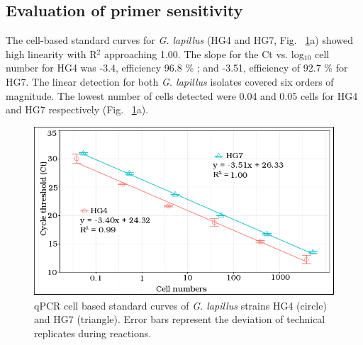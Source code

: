 \documentclass[12pt]{article}
\begin{document}
 
\subsection*{Evaluation of primer sensitivity}
\FloatBarrier
The cell-based standard curves for \emph{G. lapillus} (HG4 and HG7, Fig. ~\ref{fig:stdCurve}a) showed high linearity with R$^{2}$ approaching 1.00. 
The slope for the Ct vs. log$_{10}$ cell number for HG4  was -3.4, efficiency 96.8 \%%
; and -3.51, efficiency of 92.7 \% %
for HG7. The linear detection for both \emph{G. lapillus} isolates covered six orders of magnitude. 
The lowest number of cells detected were 0.04 and 0.05 cells for HG4 and HG7 respectively (Fig. ~\ref{fig:stdCurve}a).
\begin{figure}
\includegraphics[scale=.85]{Hero_qpcr-figs/Fig2_cell-based-stds-merged.png}
\caption{qPCR cell based standard curves of \emph{G. lapillus} strains HG4 (circle) and HG7 (triangle). Error bars represent the deviation of technical replicates during reactions.}%
\label{fig:stdCurve}
\end{figure}
\end{document}

